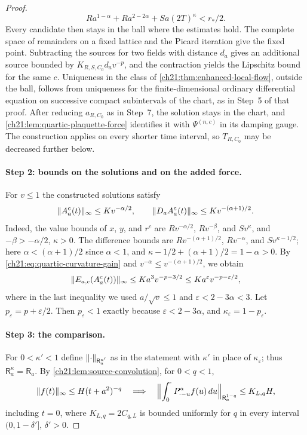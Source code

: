 \begin{proof}
\[
 Ra^{1-\alpha}+Ra^{2-2\alpha}+Sa(2T)^\kappa<r_*/2 .
\]
Every candidate then stays in the ball where the estimates hold. The complete space of remainders on a fixed lattice and the Picard iteration give the fixed point. Subtracting the sources for two fields with distance $d_a$ gives an additional source bounded by $K_{R,S,C_0}d_av^{-p}$, and the contraction yields the Lipschitz bound for the same $c$. Uniqueness in the class of \cref{ch21:thm:enhanced-local-flow}, outside the ball, follows from uniqueness for the finite-dimensional ordinary differential equation on successive compact subintervals of the chart, as in Step~5 of that proof. After reducing $a_{R,C_0}$ as in Step~7, the solution stays in the chart, and \cref{ch21:lem:quartic-plaquette-force} identifies it with $\Psi^{(n,c)}$ in its damping gauge. The construction applies on every shorter time interval, so $T_{R,C_0}$ may be decreased further below.

\paragraph{Step 2: bounds on the solutions and on the added force.}
For $v\le1$ the constructed solutions satisfy
\[
 \lVert A_a^c(t)\rVert_\infty\le Kv^{-\alpha/2},\qquad\lVert D_aA_a^c(t)\rVert_\infty\le Kv^{-(\alpha+1)/2}.
\]
Indeed, the value bounds of $x$, $y$, and $r^c$ are $Rv^{-\alpha/2}$, $Rv^{-\beta}$, and $Sv^\kappa$, and $-\beta>-\alpha/2$, $\kappa>0$. The difference bounds are $Rv^{-(\alpha+1)/2}$, $Rv^{-\alpha}$, and $Sv^{\kappa-1/2}$; here $\alpha<(\alpha+1)/2$ since $\alpha<1$, and $\kappa-1/2+(\alpha+1)/2=1-\alpha>0$. By \eqref{ch21:eq:quartic-curvature-gain} and $v^{-\alpha}\le v^{-(\alpha+1)/2}$, we obtain
\[
 \lVert E_{a,c}(A_a^c(t))\rVert_\infty\le Ka^3v^{-p-3/2}\le Ka^\varepsilon v^{-p-\varepsilon/2},
\]
where in the last inequality we used $a/\sqrt v\le1$ and $\varepsilon<2-3\alpha<3$. Let $p_\varepsilon=p+\varepsilon/2$. Then $p_\varepsilon<1$ exactly because $\varepsilon<2-3\alpha$, and $\kappa_\varepsilon=1-p_\varepsilon$.

\paragraph{Step 3: the comparison.}
For $0<\kappa'<1$ define $\lVert \cdot\rVert_{\mathsf R_a^{\kappa'}}$ as in the statement with $\kappa'$ in place of $\kappa_\varepsilon$; thus $\mathsf R_a^\kappa=\mathsf R_a$. By \cref{ch21:lem:source-convolution}, for $0<q<1$,
\begin{equation}\label{ch21:eq:quartic-source-heat}
 \lVert f(t)\rVert_\infty\le H(t+a^2)^{-q}\quad\Longrightarrow\quad
 \Bigl\lVert\int_0^\cdot P^a_{\cdot-u}f(u)\,du\Bigr\rVert_{\mathsf R_a^{1-q}}\le K_{L,q}H,
\end{equation}
including $t=0$, where $K_{L,q}=2C_{q,L}$ is bounded uniformly for $q$ in every interval $(0,1-\delta']$, $\delta'>0$.


\end{proof}
